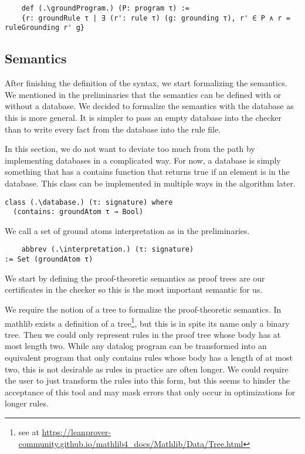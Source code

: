 \begin{lstlisting}
    def (.\groundProgram.) (P: program τ) := 
    {r: groundRule τ | ∃ (r': rule τ) (g: grounding τ), r' ∈ P ∧ r = ruleGrounding r' g}
\end{lstlisting}

\subsection{Semantics}

After finishing the definition of the syntax, we start formalizing the semantics. We mentioned in the preliminaries that the semantics can be defined with or without a database. We decided to formalize the semantics with the database as this is more general. It is simpler to pass an empty database into the checker than to write every fact from the database into the rule file.

In this section, we do not want to deviate too much from the path by implementing databases in a complicated way. For now, a database is simply something that has a contains function that returns true if an element is in the database. This class can be implemented in multiple ways in the algorithm later.

\begin{lstlisting}
class (.\database.) (τ: signature) where
  (contains: groundAtom τ → Bool)
\end{lstlisting}

We call a set of ground atoms interpretation as in the preliminaries.
\begin{lstlisting}
    abbrev (.\interpretation.) (τ: signature)
:= Set (groundAtom τ)
\end{lstlisting}

We start by defining the proof-theoretic semantics as proof trees are our certificates in the checker so this is the most important semantic for us.

We require the notion of a tree to formalize the proof-theoretic semantics. In mathlib exists a definition of a tree\footnote{see at \protect\url{https://leanprover-community.github.io/mathlib4_docs/Mathlib/Data/Tree.html}}, but this is in spite its name only a binary tree. Then we could only represent rules in the proof tree whose body has at most length two. While any datalog program can be transformed into an equivalent program that only contains rules whose body has a length of at most two, this is not desirable as rules in practice are often longer. We could require the user to just transform the rules into this form, but this seems to hinder the acceptance of this tool and may mask errors that only occur in optimizations for longer rules.

